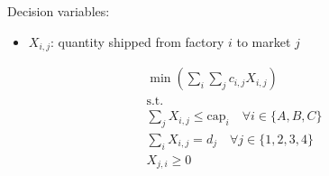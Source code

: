 \documentclass[10pt]{article}
\begin{document}
Decision variables: 
\begin{itemize}
    \item $X_{i, j}$: quantity shipped from factory $i $ to market $j $
\end{itemize}

\begin{gather*}
    \min\left(\sum_{i}\sum_{j}c_{i, j}X_{i, j}\right)\\
    \text{s.t.}\\
    \sum_{j}X_{i, j}\le\text{cap}_{i}\quad\forall i\in\{A, B, C\}\\
    \sum_{i}X_{i, j} = d_j\quad\forall j \in \{1, 2, 3, 4\}\\
    X_{j, i}\ge 0
\end{gather*}
\end{document}
